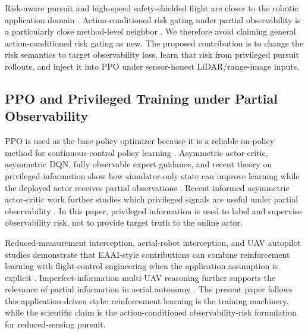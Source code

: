 \documentclass[lettersize,journal]{IEEEtran}
\begin{document}
Risk-aware pursuit and high-speed safety-shielded flight are closer to the robotic application domain \cite{grape2019riskaware,zhang2026safetyshieldedflight}. Action-conditioned risk gating under partial observability is a particularly close method-level neighbor \cite{liu2026actionriskgating}. We therefore avoid claiming general action-conditioned risk gating as new. The proposed contribution is to change the risk semantics to target observability loss, learn that risk from privileged pursuit rollouts, and inject it into PPO under sensor-honest LiDAR/range-image inputs.

\subsection{PPO and Privileged Training under Partial Observability}

PPO is used as the base policy optimizer because it is a reliable on-policy method for continuous-control policy learning \cite{schulman2017ppo}. Asymmetric actor-critic, asymmetric DQN, fully observable expert guidance, and recent theory on privileged information show how simulator-only state can improve learning while the deployed actor receives partial observations \cite{pinto2017aac,baisero2022adqn,nguyen2023fo2po,cai2024privilegedpomdp}. Recent informed asymmetric actor-critic work further studies which privileged signals are useful under partial observability \cite{ebi2026iaac}. In this paper, privileged information is used to label and supervise observability risk, not to provide target truth to the online actor.

Reduced-measurement interception, aerial-robot interception, and UAV autopilot studies demonstrate that EAAI-style contributions can combine reinforcement learning with flight-control engineering when the application assumption is explicit \cite{ren2025losrate,giral2026intercept,liu2026autopilot}. Imperfect-information multi-UAV reasoning further supports the relevance of partial information in aerial autonomy \cite{gao2026mentalstates}. The present paper follows this application-driven style: reinforcement learning is the training machinery, while the scientific claim is the action-conditioned observability-risk formulation for reduced-sensing pursuit.
\end{document}
